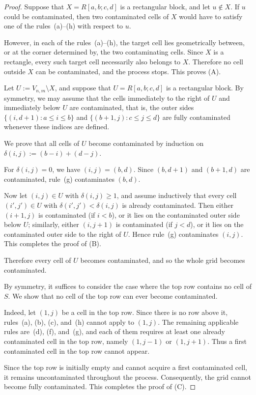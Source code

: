 \documentclass[letterpaper,12pt]{article}
\begin{document}
\begin{proof}
  Suppose that $X=R[a,b;c,d]$ is a rectangular block, and let $u\notin X$.
    If $u$ could be contaminated, then two contaminated cells of $X$ would have to satisfy one of
    the rules~(a)--(h) with respect to $u$.

    However, in each of the rules~(a)--(h), the target cell lies geometrically between, or at the
    corner determined by, the two contaminating cells. Since $X$ is a rectangle, every such target
    cell necessarily also belongs to $X$. Therefore no cell outside $X$ can be contaminated, and the
    process stops. This proves \textup{(A)}.

     Let $U:=V_{n,m}\setminus X$, and suppose that $U=R[a,b;c,d]$ is a rectangular block.
    By symmetry, we may assume that the cells immediately to the right of $U$ and immediately below
    $U$ are contaminated, that is, the outer sides $\{(i,d+1): a\le i\le b\}$ and $\{(b+1,j): c\le j\le d\}$ are fully contaminated whenever these indices are defined.

    We prove that all cells of $U$ become contaminated by induction on $\delta(i,j):=(b-i)+(d-j)$.
    

    For $\delta(i,j)=0$, we have $(i,j)=(b,d)$. Since $(b,d+1)$ and $(b+1,d)$ are contaminated,
    rule~(g) contaminates $(b,d)$.

    Now let $(i,j)\in U$ with $\delta(i,j)\ge 1$, and assume inductively that every cell
    $(i',j')\in U$ with $\delta(i',j')<\delta(i,j)$ is already contaminated.
    Then either $(i+1,j)$ is contaminated (if $i<b$), or it lies on the contaminated outer side
    below $U$; similarly, either $(i,j+1)$ is contaminated (if $j<d$), or it lies on the contaminated
    outer side to the right of $U$. Hence rule~(g) contaminates $(i,j)$. This completes the proof of \textup{(B)}. 

    Therefore every cell of $U$ becomes contaminated, and so the whole grid becomes contaminated.

     By symmetry, it suffices to consider the case where the top row contains no cell of $S$.
    We show that no cell of the top row can ever become contaminated.

    Indeed, let $(1,j)$ be a cell in the top row. Since there is no row above it, rules~(a), (b),
    (c), and~(h) cannot apply to $(1,j)$. The remaining applicable rules are~(d), (f), and~(g),
    and each of them requires at least one already contaminated cell in the top row, namely
    $(1,j-1)$ or $(1,j+1)$.
    Thus a first contaminated cell in the top row cannot appear.

    Since the top row is initially empty and cannot acquire a first contaminated cell, it remains
    uncontaminated throughout the process. Consequently, the grid cannot become fully contaminated. This completes the proof of \textup{(C)}.\qedhere
\end{proof}
\end{document}
